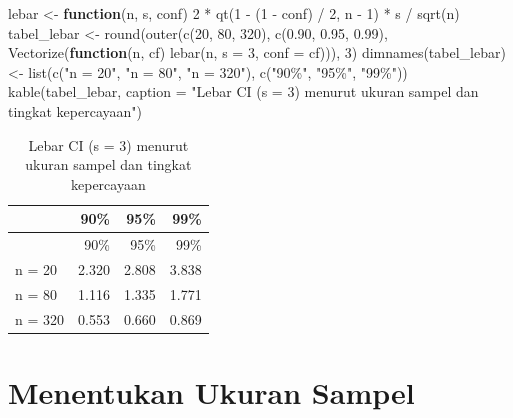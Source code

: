\documentclass[
  indonesian,
  letterpaper,
]{book}
\newenvironment{Shaded}{\begin{snugshade}}{\end{snugshade}}
\newcommand{\AttributeTok}[1]{\textcolor[rgb]{0.40,0.45,0.13}{#1}}
\newcommand{\ControlFlowTok}[1]{\textcolor[rgb]{0.00,0.23,0.31}{\textbf{#1}}}
\newcommand{\DecValTok}[1]{\textcolor[rgb]{0.68,0.00,0.00}{#1}}
\newcommand{\FloatTok}[1]{\textcolor[rgb]{0.68,0.00,0.00}{#1}}
\newcommand{\FunctionTok}[1]{\textcolor[rgb]{0.28,0.35,0.67}{#1}}
\newcommand{\NormalTok}[1]{\textcolor[rgb]{0.00,0.23,0.31}{#1}}
\newcommand{\OtherTok}[1]{\textcolor[rgb]{0.00,0.23,0.31}{#1}}
\newcommand{\SpecialCharTok}[1]{\textcolor[rgb]{0.37,0.37,0.37}{#1}}
\newcommand{\StringTok}[1]{\textcolor[rgb]{0.13,0.47,0.30}{#1}}
\begin{document}
\begin{Shaded}
\begin{Highlighting}[]
\NormalTok{lebar }\OtherTok{\textless{}{-}} \ControlFlowTok{function}\NormalTok{(n, s, conf) }\DecValTok{2} \SpecialCharTok{*} \FunctionTok{qt}\NormalTok{(}\DecValTok{1} \SpecialCharTok{{-}}\NormalTok{ (}\DecValTok{1} \SpecialCharTok{{-}}\NormalTok{ conf) }\SpecialCharTok{/} \DecValTok{2}\NormalTok{, n }\SpecialCharTok{{-}} \DecValTok{1}\NormalTok{) }\SpecialCharTok{*}\NormalTok{ s }\SpecialCharTok{/} \FunctionTok{sqrt}\NormalTok{(n)}
\NormalTok{tabel\_lebar }\OtherTok{\textless{}{-}} \FunctionTok{round}\NormalTok{(}\FunctionTok{outer}\NormalTok{(}\FunctionTok{c}\NormalTok{(}\DecValTok{20}\NormalTok{, }\DecValTok{80}\NormalTok{, }\DecValTok{320}\NormalTok{), }\FunctionTok{c}\NormalTok{(}\FloatTok{0.90}\NormalTok{, }\FloatTok{0.95}\NormalTok{, }\FloatTok{0.99}\NormalTok{),}
                           \FunctionTok{Vectorize}\NormalTok{(}\ControlFlowTok{function}\NormalTok{(n, cf) }\FunctionTok{lebar}\NormalTok{(n, }\AttributeTok{s =} \DecValTok{3}\NormalTok{, }\AttributeTok{conf =}\NormalTok{ cf))), }\DecValTok{3}\NormalTok{)}
\FunctionTok{dimnames}\NormalTok{(tabel\_lebar) }\OtherTok{\textless{}{-}} \FunctionTok{list}\NormalTok{(}\FunctionTok{c}\NormalTok{(}\StringTok{"n = 20"}\NormalTok{, }\StringTok{"n = 80"}\NormalTok{, }\StringTok{"n = 320"}\NormalTok{), }\FunctionTok{c}\NormalTok{(}\StringTok{"90\%"}\NormalTok{, }\StringTok{"95\%"}\NormalTok{, }\StringTok{"99\%"}\NormalTok{))}
\FunctionTok{kable}\NormalTok{(tabel\_lebar, }\AttributeTok{caption =} \StringTok{"Lebar CI (s = 3) menurut ukuran sampel dan tingkat kepercayaan"}\NormalTok{)}
\end{Highlighting}
\end{Shaded}

\begin{longtable}[]{@{}lrrr@{}}
\caption{Lebar CI (s = 3) menurut ukuran sampel dan tingkat
kepercayaan}\tabularnewline
\toprule\noalign{}
& 90\% & 95\% & 99\% \\
\midrule\noalign{}
\endfirsthead
\toprule\noalign{}
& 90\% & 95\% & 99\% \\
\midrule\noalign{}
\endhead
\bottomrule\noalign{}
\endlastfoot
n = 20 & 2.320 & 2.808 & 3.838 \\
n = 80 & 1.116 & 1.335 & 1.771 \\
n = 320 & 0.553 & 0.660 & 0.869 \\
\end{longtable}

\section{Menentukan Ukuran Sampel}\label{menentukan-ukuran-sampel}
\end{document}
